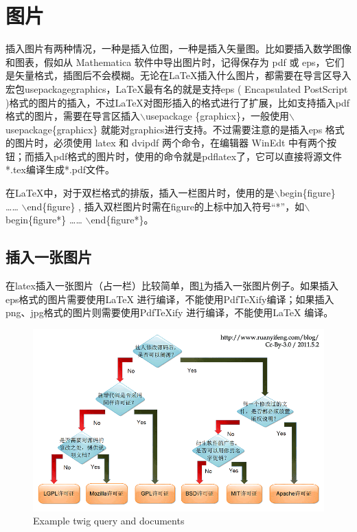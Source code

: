 \section{图片}
插入图片有两种情况，一种是插入位图，一种是插入矢量图。比如要插入数学图像和图表，假如从 Mathematica 软件中导出图片时，记得保存为 pdf 或 eps，它们是矢量格式，插图后不会模糊。无论在\LaTeX 插入什么图片，都需要在导言区导入宏包usepackage{graphics}，\LaTeX 最有名的就是支持eps ( Encapsulated PostScript )格式的图片的插入，不过\LaTeX 对图形插入的格式进行了扩展，比如支持插入pdf格式的图片，需要在导言区插入$\backslash$usepackage \{graphicx\}，一般使用$\backslash$usepackage\{graphicx\} 就能对graphics进行支持。不过需要注意的是插入eps 格式的图片时，必须使用 latex 和 dvipdf 两个命令，在编辑器 WinEdt 中有两个按钮；而插入pdf格式的图片时，使用的命令就是pdflatex了，它可以直接将源文件*.tex编译生成*.pdf文件。 \par
在\LaTeX 中，对于双栏格式的排版，插入一栏图片时，使用的是$\backslash$begin\{figure\} …… $\backslash$end\{figure\} , 插入双栏图片时需在figure的上标中加入符号“*”，如$\backslash$begin\{figure*\} …… $\backslash$end\{figure*\}。\par
\subsection{插入一张图片}
在latex插入一张图片（占一栏）比较简单，图\ref{fig_example1}为插入一张图片例子。如果插入eps格式的图片需要使用LaTeX 进行编译，不能使用PdfTeXify编译；如果插入png、jpg格式的图片则需要使用PdfTeXify 进行编译，不能使用LaTeX 编译。\par
\begin{figure}
\centering      %
\includegraphics[width=12cm,angle=0]{figures/OpenSource.png}
\caption{Example twig query and documents }     %
\label{fig_example1}
\end{figure}


